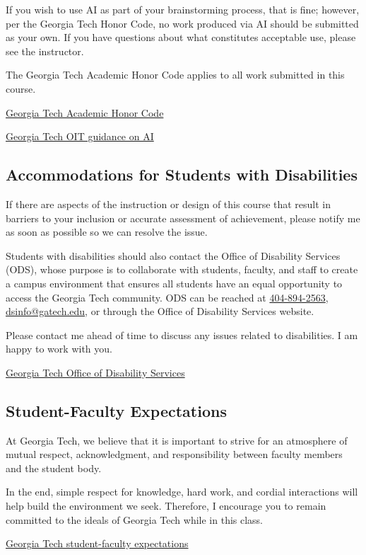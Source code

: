 \documentclass[11pt]{article}
\begin{document}
If you wish to use AI as part of your brainstorming process, that is
fine; however, per the Georgia Tech Honor Code, no work produced via AI
should be submitted as your own. If you have questions about what
constitutes acceptable use, please see the instructor.

The Georgia Tech Academic Honor Code applies to all work submitted in
this course.

\href{https://policylibrary.gatech.edu/student-life/academic-honor-code}
{Georgia Tech Academic Honor Code}

\href{https://oit.gatech.edu/ai/guidance}{Georgia Tech OIT guidance on AI}

\subsection*{Accommodations for Students with Disabilities}

If there are aspects of the instruction or design of this course that
result in barriers to your inclusion or accurate assessment of
achievement, please notify me as soon as possible so we can resolve the
issue.

Students with disabilities should also contact the Office of Disability
Services (ODS), whose purpose is to collaborate with students, faculty,
and staff to create a campus environment that ensures all students have
an equal opportunity to access the Georgia Tech community. ODS can be
reached at \href{tel:4048942563}{404-894-2563},
\href{mailto:dsinfo@gatech.edu}{dsinfo@gatech.edu}, or through the
Office of Disability Services website.

Please contact me ahead of time to discuss any issues related to
disabilities. I am happy to work with you.

\href{https://disabilityservices.gatech.edu/}
{Georgia Tech Office of Disability Services}

\subsection*{Student-Faculty Expectations}

At Georgia Tech, we believe that it is important to strive for an atmosphere of mutual respect, acknowledgment, and responsibility between faculty members and the student body.

In the end, simple respect for knowledge, hard work, and cordial interactions will help build the environment we seek. Therefore, I encourage you to remain committed to the ideals of Georgia Tech while in this class.

\href{http://www.catalog.gatech.edu/rules/21/}{Georgia Tech student-faculty expectations}
\end{document}
